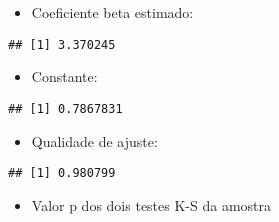 \documentclass[]{article}
\newenvironment{Shaded}{\begin{snugshade}}{\end{snugshade}}
\newcommand{\NormalTok}[1]{#1}
\newcommand{\OperatorTok}[1]{\textcolor[rgb]{0.81,0.36,0.00}{\textbf{#1}}}
\providecommand{\tightlist}{%
  \setlength{\itemsep}{0pt}\setlength{\parskip}{0pt}}
\begin{document}
\begin{itemize}
\tightlist
\item
  Coeficiente beta estimado:
\end{itemize}

\begin{Shaded}
\end{Shaded}

\begin{verbatim}
## [1] 3.370245
\end{verbatim}

\begin{itemize}
\tightlist
\item
  Constante:
\end{itemize}

\begin{Shaded}
\end{Shaded}

\begin{verbatim}
## [1] 0.7867831
\end{verbatim}

\begin{itemize}
\tightlist
\item
  Qualidade de ajuste:
\end{itemize}

\begin{Shaded}
\end{Shaded}

\begin{verbatim}
## [1] 0.980799
\end{verbatim}

\begin{itemize}
\tightlist
\item
  Valor p dos dois testes K-S da amostra
\end{itemize}

\begin{Shaded}
\end{Shaded}
\end{document}
